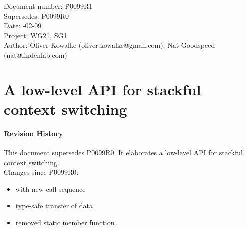 \documentclass[paper=A4,pagesize,DIV=15]{scrartcl}
\begin{document}
\small
\begin{tabbing}
    Document number: \= P0099R1\\
    Supersedes:      \> P0099R0\\
    Date:            -02-09\\
    Project:         \> WG21, SG1\\
    Author:          \> Oliver Kowalke (oliver.kowalke@gmail.com), Nat Goodspeed (nat@lindenlab.com)\\
\end{tabbing}

\section*{A low-level API for stackful context switching}


\tableofcontents


\paragraph*{Revision History}
This document supersedes P0099R0. It elaborates a low-level API for stackful
context switching.\\
\newline
Changes since P0099R0:

\begin{itemize}
    \item {} with new call sequence
    \item type-safe transfer of data
    \item removed static member function .
\end{itemize}




%











\end{document}
